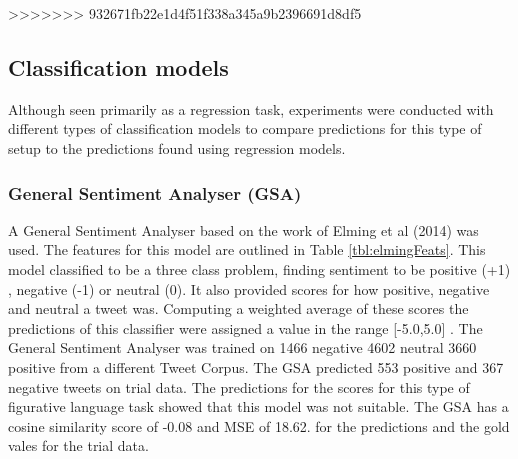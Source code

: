 \documentclass[11pt,letterpaper]{article}
\begin{document}
>>>>>>> 932671fb22e1d4f51f338a345a9b2396691d8df5
 
\subsection{Classification models}
\label{subsec:classification}
Although seen primarily as a regression task, experiments were conducted with different types of classification models to compare predictions for this type of setup to the predictions found using regression models.

\subsubsection{General Sentiment Analyser (GSA)}
\label{subsec:GSA}
A General Sentiment Analyser based on the work of Elming et al (2014) was used. The features for this model are outlined in Table \ref{tbl:elmingFeats}. This model classified to be a three class problem, finding sentiment to be positive (+1) , negative (-1) or neutral (0). It also provided scores for how positive, negative and neutral a tweet was. Computing a weighted average of these scores the predictions of this classifier were assigned a value in the range [-5.0,5.0] . The General Sentiment Analyser was trained on 1466 negative 4602 neutral 3660 positive from a different Tweet Corpus. The GSA predicted 553 positive and 367 negative tweets on trial data. The predictions for the scores for this type of figurative language task showed that this model was not suitable. The GSA has a cosine similarity score of -0.08 and MSE of 18.62. for the predictions and the gold vales for the trial data. 
\end{document}
